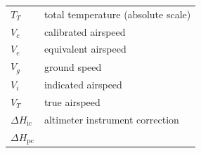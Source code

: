 \documentclass[
]{book}
\begin{document}
\begin{longtable}[]{@{}ll@{}}
\begin{minipage}[t]{0.22\columnwidth}\raggedright
\(T_T\)\strut
\end{minipage} & \begin{minipage}[t]{0.72\columnwidth}\raggedright
total temperature (absolute scale)\strut
\end{minipage}\tabularnewline
\begin{minipage}[t]{0.22\columnwidth}\raggedright
\(V_c\)\strut
\end{minipage} & \begin{minipage}[t]{0.72\columnwidth}\raggedright
calibrated airspeed\strut
\end{minipage}\tabularnewline
\begin{minipage}[t]{0.22\columnwidth}\raggedright
\(V_e\)\strut
\end{minipage} & \begin{minipage}[t]{0.72\columnwidth}\raggedright
equivalent airspeed\strut
\end{minipage}\tabularnewline
\begin{minipage}[t]{0.22\columnwidth}\raggedright
\(V_g\)\strut
\end{minipage} & \begin{minipage}[t]{0.72\columnwidth}\raggedright
ground speed\strut
\end{minipage}\tabularnewline
\begin{minipage}[t]{0.22\columnwidth}\raggedright
\(V_i\)\strut
\end{minipage} & \begin{minipage}[t]{0.72\columnwidth}\raggedright
indicated airspeed\strut
\end{minipage}\tabularnewline
\begin{minipage}[t]{0.22\columnwidth}\raggedright
\(V_T\)\strut
\end{minipage} & \begin{minipage}[t]{0.72\columnwidth}\raggedright
true airspeed\strut
\end{minipage}\tabularnewline
\begin{minipage}[t]{0.22\columnwidth}\raggedright
\(\Delta H_{\mathrm{ic}}\)\strut
\end{minipage} & \begin{minipage}[t]{0.72\columnwidth}\raggedright
altimeter instrument correction\strut
\end{minipage}\tabularnewline
\begin{minipage}[t]{0.22\columnwidth}\raggedright
\(\Delta H_{\mathrm{pc}}\)\strut
\end{minipage} & \begin{minipage}[t]{0.72\columnwidth}\raggedright

\end{minipage}
\end{longtable}
\end{document}
